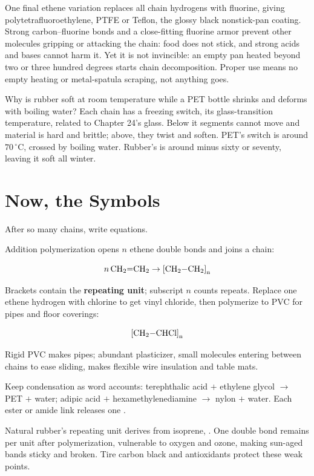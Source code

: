 One final ethene variation replaces all chain hydrogens with fluorine, giving polytetrafluoroethylene, PTFE or Teflon, the glossy black nonstick-pan coating. Strong carbon--fluorine bonds and a close-fitting fluorine armor prevent other molecules gripping or attacking the chain: food does not stick, and strong acids and bases cannot harm it. Yet it is not invincible: an empty pan heated beyond two or three hundred degrees starts chain decomposition. Proper use means no empty heating or metal-spatula scraping, not anything goes.

Why is rubber soft at room temperature while a PET bottle shrinks and deforms with boiling water? Each chain has a freezing switch, its glass-transition temperature, related to Chapter 24's glass. Below it segments cannot move and material is hard and brittle; above, they twist and soften. PET's switch is around $70\,^{\circ}\mathrm{C}$, crossed by boiling water. Rubber's is around minus sixty or seventy, leaving it soft all winter.

\section{Now, the Symbols}

After so many chains, write equations.

Addition polymerization opens $n$ ethene double bonds and joins a chain:

\[n\,\mathrm{CH_2{=}CH_2} \rightarrow \mathrm{{[CH_2{-}CH_2]}_{n}}\]

Brackets contain the \textbf{repeating unit}; subscript $n$ counts repeats. Replace one ethene hydrogen with chlorine to get vinyl chloride, then polymerize to PVC for pipes and floor coverings:

\[\mathrm{{[CH_2{-}CHCl]}_{n}}\]

Rigid PVC makes pipes; abundant plasticizer, small molecules entering between chains to ease sliding, makes flexible wire insulation and table mats.

Keep condensation as word accounts: terephthalic acid $+$ ethylene glycol $\rightarrow$ PET $+$ water; adipic acid $+$ hexamethylenediamine $\rightarrow$ nylon $+$ water. Each ester or amide link releases one .

Natural rubber's repeating unit derives from isoprene, . One double bond remains per unit after polymerization, vulnerable to oxygen and ozone, making sun-aged bands sticky and broken. Tire carbon black and antioxidants protect these weak points.


